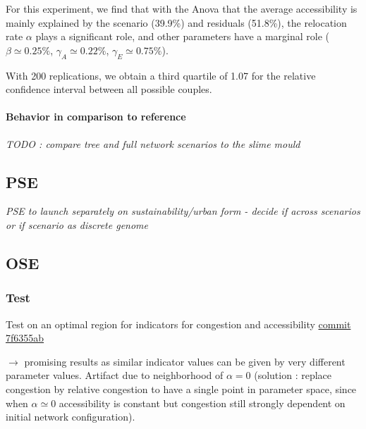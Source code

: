 
For this experiment, we find that with the Anova that the average accessibility is mainly explained by the scenario (39.9\%) and residuals (51.8\%), the relocation rate $\alpha$ plays a significant role, and other parameters have a marginal role ($\beta \simeq 0.25\%$, $\gamma_A \simeq 0.22\%$, $\gamma_E \simeq 0.75\%$).

With 200 replications, we obtain a third quartile of 1.07 for the relative confidence interval between all possible couples.






\paragraph{Behavior in comparison to reference}

\textit{TODO : compare tree and full network scenarios to the slime mould}




\subsection{PSE}

\textit{PSE to launch separately on sustainability/urban form - decide if across scenarios or if scenario as discrete genome}


\subsection{OSE}


\subsubsection{Test}

Test on an optimal region for indicators for congestion and accessibility \href{https://github.com/JusteRaimbault/Governance/commit/7f6355aba398948242e7b3f9984c20c3137900c9}{commit 7f6355ab}

$\rightarrow$ promising results as similar indicator values can be given by very different parameter values. Artifact due to neighborhood of $\alpha = 0$ (solution : replace congestion by relative congestion to have a single point in parameter space, since when $\alpha \simeq 0$ accessibility is constant but congestion still strongly dependent on initial network configuration).

